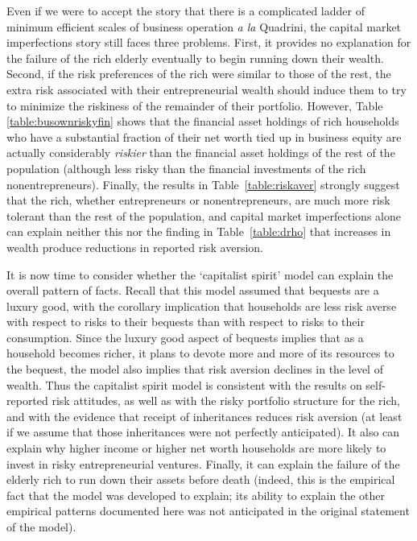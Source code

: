 \documentclass[12pt]{article}
\begin{document}
{\normalsize Even if we were to accept the story that there is a complicated
ladder of minimum efficient scales of business operation \textit{a la}
Quadrini, the capital market imperfections story still faces three problems.
First, it provides no explanation for the failure of the rich elderly
eventually to begin running down their wealth. Second, if the risk
preferences of the rich were similar to those of the rest, the extra risk
associated with their entrepreneurial wealth should induce them to try to
minimize the riskiness of the remainder of their portfolio. However, Table~%
\ref{table:busownriskyfin} shows that the financial asset holdings of rich
households who have a substantial fraction of their net worth tied up in
business equity are actually considerably \textit{riskier} than the
financial asset holdings of the rest of the population (although less risky
than the financial investments of the rich nonentrepreneurs). Finally, the
results in Table~\ref{table:riskaver} strongly suggest that the rich,
whether entrepreneurs or nonentrepreneurs, are much more risk tolerant than
the rest of the population, and capital market imperfections alone can
explain neither this nor the finding in Table~\ref{table:drho} that
increases in wealth produce reductions in reported risk aversion. }

{\normalsize It is now time to consider whether the `capitalist spirit'
model can explain the overall pattern of facts. Recall that this model
assumed that bequests are a luxury good, with the corollary implication that
households are less risk averse with respect to risks to their bequests than
with respect to risks to their consumption. Since the luxury good aspect of
bequests implies that as a household becomes richer, it plans to devote more
and more of its resources to the bequest, the model also implies that risk
aversion declines in the level of wealth. Thus the capitalist spirit model
is consistent with the results on self-reported risk attitudes, as well as
with the risky portfolio structure for the rich, and with the evidence that
receipt of inheritances reduces risk aversion (at least if we assume that
those inheritances were not perfectly anticipated). It also can explain why
higher income or higher net worth households are more likely to invest in
risky entrepreneurial ventures. Finally, it can explain the failure of the
elderly rich to run down their assets before death (indeed, this is the
empirical fact that the model was developed to explain; its ability to
explain the other empirical patterns documented here was not anticipated in
the original statement of the model). }
\end{document}
